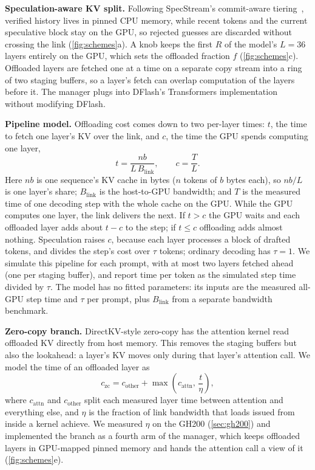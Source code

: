 \documentclass{article}
\begin{document}
\textbf{Speculation-aware KV split.} Following SpecStream's commit-aware tiering~\citep{li2026specstream}, verified history lives in pinned CPU memory, while recent tokens and the current speculative block stay on the GPU, so rejected guesses are discarded without crossing the link (\cref{fig:schemes}a). A knob keeps the first $R$ of the model's $L=36$ layers entirely on the GPU, which sets the offloaded fraction $f$ (\cref{fig:schemes}c). Offloaded layers are fetched one at a time on a separate copy stream into a ring of two staging buffers, so a layer's fetch can overlap computation of the layers before it. The manager plugs into DFlash's Transformers implementation~\citep{wolf2020transformers} without modifying DFlash.

\textbf{Pipeline model.} Offloading cost comes down to two per-layer times: $t$, the time to fetch one layer's KV over the link, and $c$, the time the GPU spends computing one layer,
\begin{equation}
t = \frac{nb}{L\,B_\text{link}}, \qquad c = \frac{T}{L}.
\label{eq:times}
\end{equation}
Here $nb$ is one sequence's KV cache in bytes ($n$ tokens of $b$ bytes each), so $nb/L$ is one layer's share; $B_\text{link}$ is the host-to-GPU bandwidth; and $T$ is the measured time of one decoding step with the whole cache on the GPU. While the GPU computes one layer, the link delivers the next. If $t > c$ the GPU waits and each offloaded layer adds about $t - c$ to the step; if $t \le c$ offloading adds almost nothing. Speculation raises $c$, because each layer processes a block of drafted tokens, and divides the step's cost over $\tau$ tokens; ordinary decoding has $\tau = 1$. We simulate this pipeline for each prompt, with at most two layers fetched ahead (one per staging buffer), and report time per token as the simulated step time divided by $\tau$. The model has no fitted parameters: its inputs are the measured all-GPU step time and $\tau$ per prompt, plus $B_\text{link}$ from a separate bandwidth benchmark.

\textbf{Zero-copy branch.} DirectKV-style zero-copy \citep{luo2026directkv} has the attention kernel read offloaded KV directly from host memory. This removes the staging buffers but also the lookahead: a layer's KV moves only during that layer's attention call. We model the time of an offloaded layer as
\begin{equation}
c_{\text{zc}} = c_{\text{other}} + \max\!\left(c_{\text{attn}},\, \frac{t}{\eta}\right),
\label{eq:zerocopy}
\end{equation}
where $c_{\text{attn}}$ and $c_{\text{other}}$ split each measured layer time between attention and everything else, and $\eta$ is the fraction of link bandwidth that loads issued from inside a kernel achieve. We measured $\eta$ on the GH200 (\cref{sec:gh200}) and implemented the branch as a fourth arm of the manager, which keeps offloaded layers in GPU-mapped pinned memory and hands the attention call a view of it (\cref{fig:schemes}e).
\end{document}
